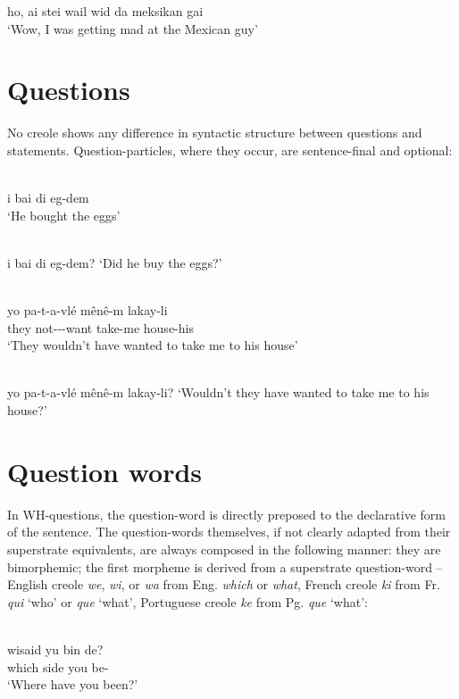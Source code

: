 \ea\label{ex:2:74}
 ho, ai stei wail wid da meksikan gai\\
\glt `Wow, I was getting mad at the Mexican guy'
\z


\section{Questions}
No creole shows any difference in syntactic structure between questions and statements. Question-particles, where they occur, are sentence-final and optional:

\ea\label{ex:2:75}
 \\
 i bai di eg-dem\\
\glt `He bought the eggs'
\z

\ea\label{ex:2:76}
\\
i bai di eg-dem?
\glt `Did he buy the eggs?'
\z

\ea\label{ex:2:77}
\\
\gll yo pa-t-a-vlé m{\^e}n{\^e}-m lakay-li\\
they not-\TNS-\MOD-want take-me house-his\\
\glt `They wouldn't have wanted to take me to his house'
\z

\ea\label{ex:2:78}
\\
yo pa-t-a-vlé m{\^e}n{\^e}-m lakay-li?
\glt `Wouldn't they have wanted to take me to his house?'
\z
\section{Question words}

In WH-questions, the question-word is directly preposed to the declarative form of the sentence. The question-words themselves, if not clearly adapted from their superstrate equivalents, are always composed in the following manner: they are bimorphemic; the first morpheme is derived from a superstrate question-word -- English creole \textit{we}, \textit{wi}, or \textit{wa} from Eng. \textit{which} or \textit{what}, French creole \textit{ki} from Fr. \textit{qui} `who' or \textit{que} `what', Portuguese creole \textit{ke} from Pg. \textit{que} `what':

\ea\label{ex:2:79}
\\
 \gll wisaid yu bin de?\\
{which side} you {\TNS} be-\LOC \\
\glt `Where have you been?'
\z

